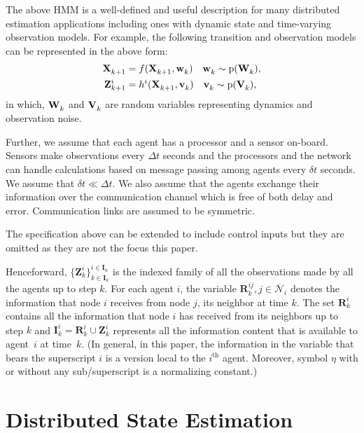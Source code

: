 \documentclass[journal]{IEEEtran}
\newcommand{\vect}[1]{{\mathbf{#1}}}
\theoremstyle{remark}
\newcommand{\pr}{\textrm{p}}
\newcommand{\XX}[3][2]{\mathbf{X}_{  #2}^{ #3}}
\newcommand{\bIn}{\boldsymbol{I}_{{n}}}
\newcommand{\bIk}{\boldsymbol{I}_{{k}}}
\newcommand{\ZZ}[3][2]{\mathbf{Z}_{ #2}^{ #3}}
\theoremstyle{definition}
\begin{document}
The above HMM is a well-defined and useful description for many distributed
estimation applications including ones with dynamic state and time-varying
observation models. For example, the following transition and observation
models can be represented in the above form:
\begin{align}
\XX[]{k+1}{} &= f(\XX[]{k+1}{},\ais{\vect{w}}{k}{})\quad \ais{\vect{w}}{k}{} \sim \pr(\ais{\vect{W}}{k}{}), \\
\ZZ{k+1}{i} &= h^i(\XX[]{k+1}{},\ais{\vect{v}}{k}{})\quad \ais{\vect{v}}{k}{} \sim \pr(\ais{\vect{V}}{k}{}), 
\end{align}
in which, $\ais{\vect{W}}{k}{}$ and $\ais{\vect{V}}{k}{}$ are random variables
representing dynamics and observation noise. 

Further, we assume that each agent
has a processor and a sensor on-board. Sensors make observations every $\Delta
t$ seconds and the processors and the network can handle calculations based on
message passing among agents every $\delta t$ seconds. We assume that $\delta t
\ll \Delta t$. We also assume that the agents exchange their information over
the communication channel which is free of both delay and error. 
Communication links are assumed to be symmetric.

The specification above can be extended to
include control inputs but they are omitted as they are not the focus this
paper. 

Henceforward, $\{\ZZ{k}{i}\}^{i\in\bIn}_{k\in\bIk}$ is the indexed family of
all the observations made by all the agents up to step $k$. For each
agent $i$, the variable $\vect{R}_{k}^{ij}, j \in \overline{\mathcal{N}}_i $
denotes the information that node $i$ receives from node $j$, its neighbor at
time $k$. The set $\vect{R}_{k}^i$ contains all the information that node $i$
has received from its neighbors up to step $k$ and $\vect{I}_{k}^i =
\vect{R}_{k}^i \cup \vect{Z}_{k}^i$ represents all the information content that
is available to agent~$i$ at time~$k$. (In general, in this paper, the
information in the variable that bears the superscript $i$ is a version local
to the $i^\text{th}$ agent. Moreover, symbol $\eta$ with or without any
sub/superscript is a normalizing constant.)

\section{Distributed State Estimation} \label{subsec:Preliminaries}
\end{document}

